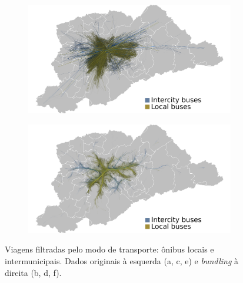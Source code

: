 \begin{figure}[!htb]
  \raggedright\noindent\hspace{-.02\textwidth}%
  \begin{subfigure}{0.55\textwidth}
    \centering
    \includegraphics[width=1\textwidth]{../figuras/busesLocalXmetropolitan/unbundled-buses-and-metropolitan.png}
    \caption{\label{fig:bus-integration-e}}
  \end{subfigure}\nobreak%
  \hspace{-.06\textwidth}\nobreak%
  \begin{subfigure}{0.55\textwidth}
    \centering
    \includegraphics[width=1\textwidth]{../figuras/busesLocalXmetropolitan/bundled-buses-and-metropolitan-length.png}
    \caption{\label{fig:bus-integration-f}}
  \end{subfigure}
  \caption{Viagens filtradas pelo modo de transporte: ônibus locais e intermunicipais. Dados originais à esquerda (a, c, e)  e \emph{bundling} à direita (b, d, f). \label{fig:bus-integration}}
\end{figure}

